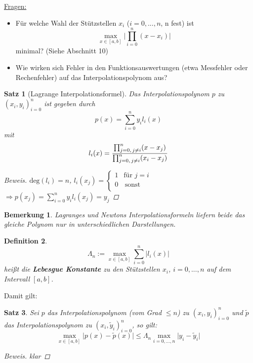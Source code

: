 \documentclass[12pt]{article}
\theoremstyle{break}
\newtheorem{theorem}{Satz}[subsection]
\newtheorem{definition}[theorem]{Definition}
\newtheorem*{comment*}{Bemerkung}
\begin{document}
\underline{Fragen:}
\begin{itemize}
  \item Für welche Wahl der Stützstellen $x_i$ ($i=0,...,n$, n fest) ist 
    $$\max_{x\in[a,b]} \vert \prod_{i=0}^n(x-x_i)\vert$$
    minimal? (Siehe Abschnitt 10)
  \item Wie wirken sich Fehler in den Funktionsauswertungen (etwa Messfehler oder Rechenfehler) auf das Interpolationspolynom aus?
\end{itemize}

\begin{theorem}[Lagrange Interpolationsformel]
Das Interpolationspolynom $p$ zu $(x_i, y_i)_{i=0}^n$ ist gegeben durch 
$$p(x) = \sum_{i=0}^n y_il_i(x)$$
mit 
$$l_i(x) = \frac{\prod_{j=0,\thinspace j\neq i}^n (x-x_j) }{\prod_{j=0,\thinspace j\neq i}^n ( x_i-x_j)}$$
\begin{proof}[Beweis]
$\text{deg}(l_i) = n$, $l_i(x_j) = \left\{
\begin{array}{ll}
1 & \textrm{für } j=i \\
0 & \, \textrm{sonst} \\
\end{array}
\right.$ \\
$\Rightarrow p(x_j) = \sum_{i=0}^n y_il_i(x_j) = y_j$
\end{proof}
\end{theorem}

\begin{comment*}
Lagranges und Newtons Interpolationsformeln liefern beide das gleiche Polynom nur in unterschiedlichen Darstellungen.
\end{comment*}

\begin{definition}
$$\Lambda_n := \max_{x\in[a,b]} \sum_{i=0}^n\vert l_i(x) \vert$$
heißt die \textbf{Lebesgue Konstante} zu den Stützstellen $x_i$, $i=0,...,n$ auf dem Intervall $[a,b]$.
\end{definition}

Damit gilt:

\begin{theorem}
Sei $p$ das Interpolationspolynom (vom Grad $\leq n$) zu $(x_i, y_i)_{i=0}^n$ und $\tilde{p}$ das Interpolationspolynom zu $(x_i, \tilde{y}_i)_{i=0}^n$, so gilt:
$$ \max_{x \in [a,b]} \vert p(x) - \tilde{p}(x) \vert \leq \Lambda_n \max_{i=0,...,n}\vert y_i - \tilde{y}_i \vert $$
\begin{proof}[Beweis]
klar
\end{proof}
\end{theorem}
\end{document}
